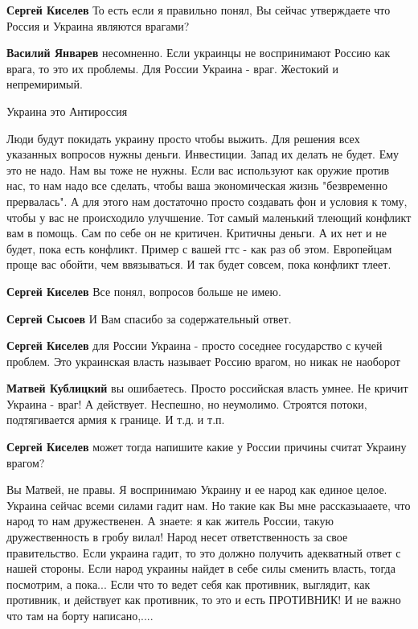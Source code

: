 \begin{itemize}
\begin{itemize}
\textbf{Сергей Киселев} То есть если я правильно понял, Вы сейчас утверждаете что Россия и Украина являются врагами?

\textbf{Василий Январев} несомненно. Если украинцы не воспринимают Россию как врага, то это их проблемы.
Для России Украина - враг. Жестокий и непремиримый.

Украина это Антироссия


Люди будут покидать украину просто чтобы выжить.
Для решения всех указанных вопросов нужны деньги.
Инвестиции.
Запад их делать не будет.
Ему это не надо.
Нам вы тоже не нужны.
Если вас используют как оружие против нас, то нам надо все сделать, чтобы ваша экономическая жизнь "безвременно прервалась".
А для этого нам достаточно просто создавать фон и условия к тому, чтобы у вас не происходило улучшение.
Тот самый маленький тлеющий конфликт вам в помощь.
Сам по себе он не критичен.
Критичны деньги.
А их нет и не будет, пока есть конфликт.
Пример с вашей гтс - как раз об этом.
Европейцам проще вас обойти, чем ввязываться.
И так будет совсем, пока конфликт тлеет.

\textbf{Сергей Киселев} Все понял, вопросов больше не имею.

\textbf{Сергей Сысоев} И Вам спасибо за содержательный ответ.

\textbf{Сергей Киселев} для России Украина - просто соседнее государство с кучей проблем. Это украинская власть называет Россию врагом, но никак не наоборот

\textbf{Матвей Кублицкий} вы ошибаетесь. Просто российская власть умнее. Не кричит Украина - враг!
А действует. Неспешно, но неумолимо.
Строятся потоки, подтягивается армия к границе. И т.д. и т.п.

\textbf{Сергей Киселев} может тогда напишите какие у России причины считат Украину врагом?

\obeycr
Вы Матвей, не правы.
Я воспринимаю Украину и ее народ как единое целое.
Украина сейчас всеми силами гадит нам.
Но такие как Вы мне рассказыааете, что народ то нам дружественен.
А знаете: я как житель России, такую дружественность в гробу вилал!
Народ несет ответственность за свое правительство.
Если украина гадит, то это должно получить адекватный ответ с нашей стороны.
Если народ украины найдет в себе силы сменить власть, тогда посмотрим, а пока...
Если что то ведет себя как противник, выглядит, как противник, и действует как противник, то это и есть ПРОТИВНИК!
И не важно что там на борту написано,....
\restorecr


\end{itemize}
\end{itemize}
